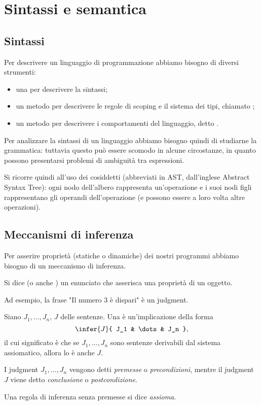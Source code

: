 \chapter{Sintassi e semantica}

\section{Sintassi}

Per descrivere un linguaggio di programmazione abbiamo bisogno di diversi strumenti:
\begin{itemize}
    \item una  per descrivere la sintassi;
    \item un metodo per descrivere le regole di scoping e il sistema dei tipi, chiamato ;
    \item un metodo per descrivere i comportamenti del linguaggio, detto .
\end{itemize}

Per analizzare la sintassi di un linguaggio abbiamo bisogno quindi di studiarne la grammatica: tuttavia questo può essere scomodo in alcune circostanze, in quanto possono presentarsi problemi di ambiguità tra espressioni.

Si ricorre quindi all'uso dei cosiddetti  (abbreviati in AST, dall'inglese Abstract Syntax Tree): ogni nodo dell'albero rappresenta un'operazione e i suoi nodi figli rappresentano gli operandi dell'operazione (e possono essere a loro volta altre operazioni).

\section{Meccanismi di inferenza}

Per asserire proprietà (statiche o dinamiche) dei nostri programmi abbiamo bisogno di un meccanismo di inferenza. 

\begin{definition}
    [judgment] Si dice  (o anche ) un enunciato che asserisca una proprietà di un oggetto.
\end{definition}

Ad esempio, la frase "Il numero $3$ è dispari" è un judgment.

\begin{definition}
     Siano $J_1, \dots, J_n$, $J$ delle sentenze. Una  è un'implicazione della forma \[
        \infer{J}{
            J_1 & \dots & J_n
        },
    \] il cui significato è che se $J_1, \dots, J_n$ sono sentenze derivabili dal sistema assiomatico, allora lo è anche $J$.

    I judgment $J_1, \dots, J_n$ vengono detti \emph{premesse} o \emph{precondizioni}, mentre il judgment $J$ viene detto \emph{conclusione} o \emph{postcondizione}.

    Una regola di inferenza senza premesse si dice \emph{assioma}.
\end{definition}

